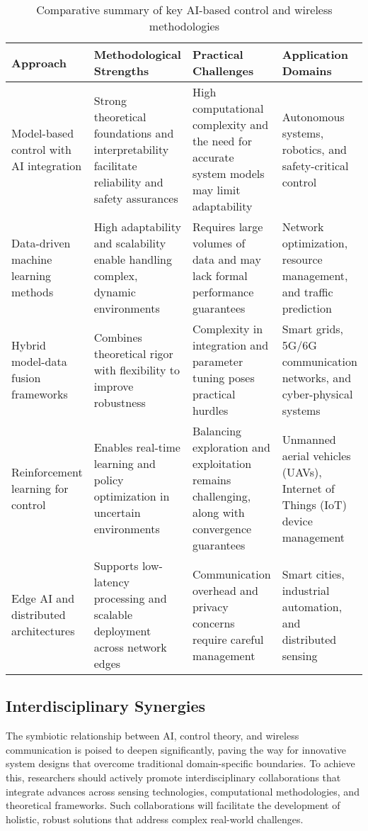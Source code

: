 \documentclass[sigconf]{acmart}
\begin{document}
\begin{table*}[htbp]
\centering
\caption{Comparative summary of key AI-based control and wireless methodologies}
\label{tab:approach_comparison}
\begin{adjustbox}{max width=\textwidth}
\begin{tabular}{@{}llll@{}}
\toprule
Approach & Methodological Strengths & Practical Challenges & Application Domains \\
\midrule
Model-based control with AI integration & Strong theoretical foundations and interpretability facilitate reliability and safety assurances & High computational complexity and the need for accurate system models may limit adaptability & Autonomous systems, robotics, and safety-critical control \\
Data-driven machine learning methods & High adaptability and scalability enable handling complex, dynamic environments & Requires large volumes of data and may lack formal performance guarantees & Network optimization, resource management, and traffic prediction \\
Hybrid model-data fusion frameworks & Combines theoretical rigor with flexibility to improve robustness & Complexity in integration and parameter tuning poses practical hurdles & Smart grids, 5G/6G communication networks, and cyber-physical systems \\
Reinforcement learning for control & Enables real-time learning and policy optimization in uncertain environments & Balancing exploration and exploitation remains challenging, along with convergence guarantees & Unmanned aerial vehicles (UAVs), Internet of Things (IoT) device management \\
Edge AI and distributed architectures & Supports low-latency processing and scalable deployment across network edges & Communication overhead and privacy concerns require careful management & Smart cities, industrial automation, and distributed sensing \\
\bottomrule
\end{tabular}
\end{adjustbox}
\end{table*}

\subsection{Interdisciplinary Synergies}

The symbiotic relationship between AI, control theory, and wireless communication is poised to deepen significantly, paving the way for innovative system designs that overcome traditional domain-specific boundaries. To achieve this, researchers should actively promote interdisciplinary collaborations that integrate advances across sensing technologies, computational methodologies, and theoretical frameworks. Such collaborations will facilitate the development of holistic, robust solutions that address complex real-world challenges.
\end{document}
